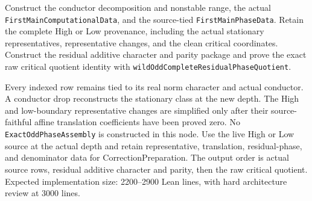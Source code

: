 \begin{theorem}
\label{mod:cases-wildodd-phasepreparation}
Construct the conductor decomposition and nonstable range, the actual
\texttt{FirstMainComputationalData}, and the source-tied
\texttt{FirstMainPhaseData}.  Retain the complete High or Low provenance,
including the actual stationary representatives, representative changes,
and the clean critical coordinates.  Construct the residual additive
character and parity package and prove the exact raw critical quotient
identity with \texttt{wildOddCompleteResidualPhaseQuotient}.

Every indexed row remains tied to its real norm character and actual
conductor.  A conductor drop reconstructs the stationary class at the new
depth.  The High and low-boundary representative changes are simplified only
after their source-faithful affine translation coefficients have been proved
zero.  No \texttt{ExactOddPhaseAssembly} is constructed in this node.
\leanok
{}
\FormalizationContract
Use the live High or Low source at the actual depth and retain representative,
translation, residual-phase, and denominator data for CorrectionPreparation.
The output order is actual source rows, residual additive character and parity,
then the raw critical quotient.  Expected implementation size: 2200--2900
Lean lines, with hard architecture review at 3000 lines.
\end{theorem}
